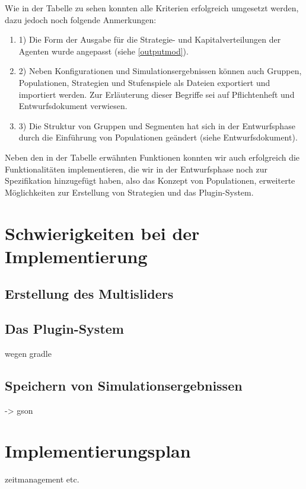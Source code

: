 \documentclass[parskip=full,11pt]{scrartcl}
\begin{document}
Wie in der Tabelle zu sehen konnten alle Kriterien erfolgreich umgesetzt werden, dazu jedoch noch folgende Anmerkungen:
\begin{enumerate}
\item[] 1) Die Form der Ausgabe für die Strategie- und Kapitalverteilungen der Agenten wurde angepasst (siehe \ref{outputmod}).
\item[] 2) Neben Konfigurationen und Simulationsergebnissen können auch Gruppen, Populationen, Strategien und Stufenspiele als Dateien exportiert und importiert werden. Zur Erläuterung dieser Begriffe sei auf Pflichtenheft und Entwurfsdokument verwiesen.
\item[] 3) Die Struktur von Gruppen und Segmenten hat sich in der Entwurfsphase durch die Einführung von Populationen geändert (siehe Entwurfsdokument).
\end{enumerate}

Neben den in der Tabelle erwähnten Funktionen konnten wir auch erfolgreich die Funktionalitäten implementieren, die wir in der Entwurfsphase noch zur Spezifikation hinzugefügt haben, also das Konzept von Populationen, erweiterte Möglichkeiten zur Erstellung von Strategien und das Plugin-System.

\section{Schwierigkeiten bei der Implementierung}

\subsection{Erstellung des Multisliders}

\subsection{Das Plugin-System}
wegen gradle

\subsection{Speichern von Simulationsergebnissen}
-> gson

\section{Implementierungsplan}
zeitmanagement etc.
\end{document}
